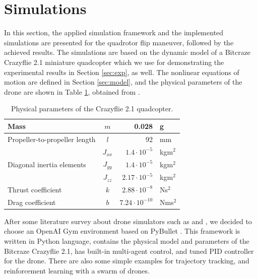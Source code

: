 \section{Simulations}\label{sec:simu}
In this section, the applied simulation framework and the implemented simulations are presented for the quadrotor flip maneuver, followed by the achieved results. The simulations are based on the dynamic model of a Bitcraze Crazyflie 2.1 miniature quadcopter which we use for demonstrating the experimental results in Section \ref{sec:exp}, as well. The nonlinear equations of motion are defined in Section \ref{sec:model}, and the physical parameters of the drone are shown in Table \ref{tab:params}, obtained from \cite{Forster}.

\begin{table}[!b]
    \centering
    \setlength{\tabcolsep}{1.5pt}
    \caption{Physical parameters of the Crazyflie 2.1 quadcopter.}
    \label{tab:params}
    \begin{tabular}{|l|c|rl|}
        \hline
        \phantom{o}Mass &\phantom{o} $m$ \phantom{o}& 0.028&g \\
        \hline
        \phantom{o}Propeller-to-propeller length \phantom{o}&\phantom{o} $l$\phantom{o} & 92&mm\\
        \hline
        \multirow{3}{*}{\phantom{o}Diagonal inertia elements} & \phantom{o}$J_{xx}$\phantom{o} & $1.4\cdot 10^{-5}$&kgm$^2$\\
         \cline{2-4}
        &\phantom{o} $J_{yy}$ \phantom{o}& $1.4\cdot 10^{-5}$&kgm$^2$\\
        \cline{2-4}
        & \phantom{o}$J_{zz}$\phantom{o} & \phantom{o}$2.17\cdot 10^{-5}$&kgm$^2$\phantom{o}\\
        \hline
        \phantom{o}Thrust coefficient & $k$ & $2.88\cdot 10^{-8}$ & Ns$^2$\\
        \hline
        \phantom{o}Drag coefficient & $b$ & \phantom{o}$7.24\cdot 10^{-10}$ & Nms$^2$\phantom{o}\\
        \hline
    \end{tabular}
\end{table}

After some literature survey about drone simulators such as \cite{airsim2017} and \cite{flightmare2020}, we decided to choose an OpenAI Gym environment based on PyBullet \cite{gym}. This framework is written in Python language, contains the physical model and parameters of the Bitcraze Crazyflie 2.1, has built-in multi-agent control, and tuned PID controller for the drone. There are also some simple examples for trajectory tracking, and reinforcement learning with a swarm of drones.

